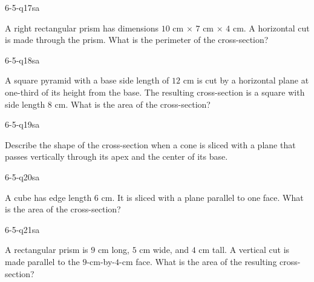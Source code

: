 \begin{practiceQuestion}{6-5-q17}{sa}
\begin{questionText}
A right rectangular prism has dimensions $10$ cm $\times$ $7$ cm $\times$ $4$ cm. A horizontal cut is made through the prism. What is the perimeter of the cross-section?
\end{questionText}
\end{practiceQuestion}

\begin{practiceQuestion}{6-5-q18}{sa}
\begin{questionText}
A square pyramid with a base side length of $12$ cm is cut by a horizontal plane at one-third of its height from the base. The resulting cross-section is a square with side length $8$ cm. What is the area of the cross-section?
\end{questionText}
\end{practiceQuestion}

\begin{practiceQuestion}{6-5-q19}{sa}
\begin{questionText}
Describe the shape of the cross-section when a cone is sliced with a plane that passes vertically through its apex and the center of its base.
\end{questionText}
\end{practiceQuestion}

\begin{practiceQuestion}{6-5-q20}{sa}
\begin{questionText}
A cube has edge length $6$ cm. It is sliced with a plane parallel to one face. What is the area of the cross-section?
\end{questionText}
\end{practiceQuestion}

\begin{practiceQuestion}{6-5-q21}{sa}
\begin{questionText}
A rectangular prism is $9$ cm long, $5$ cm wide, and $4$ cm tall. A vertical cut is made parallel to the $9$-cm-by-$4$-cm face. What is the area of the resulting cross-section?
\end{questionText}
\end{practiceQuestion}

